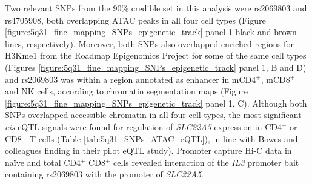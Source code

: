 Two relevant SNPs from the 90\% credible set in this analysis were rs2069803 and rs4705908, both overlapping ATAC peaks in all four cell types (Figure \ref{figure:5q31_fine_mapping_SNPs_epigenetic_track} panel 1 black and brown lines, respectively). Moreover, both SNPs also overlapped enriched regions for H3Kme1 from the Roadmap Epigenomics Project for some of the same cell types (Figures \ref{figure:5q31_fine_mapping_SNPs_epigenetic_track} panel 1, B and D) and rs2069803 was within a region annotated as enhancer in mCD4$^+$, mCD8$^+$ and NK cells, according to chromatin segmentation maps (Figure \ref{figure:5q31_fine_mapping_SNPs_epigenetic_track} panel 1, C). Although both SNPs overlapped accessible chromatin in all four cell types, the most significant \textit{cis}-eQTL signals were found for regulation of \textit{SLC22A5} expression in CD4$^+$ or CD8$^+$ T cells (Table \ref{tab:5q31_SNPs_ATAC_eQTL}), in line with Bowes and colleagues finding in their pilot eQTL study). Promoter capture Hi-C data in na\"{i}ve and total CD4$^+$ CD8$^+$ cells revealed interaction of the \textit{IL3} promoter bait containing rs2069803 with the promoter of \textit{SLC22A5}.




